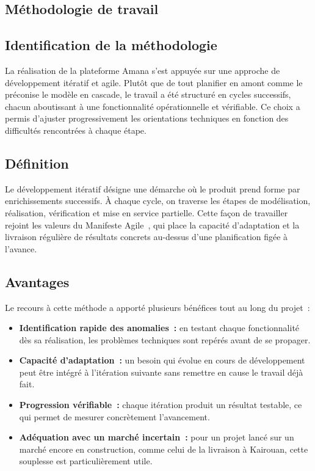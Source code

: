 \documentclass[12pt,fleqn,a4paper]{report}
\begin{document}
\begin{justify}
\section{Méthodologie de travail}

\subsection{Identification de la méthodologie}

La réalisation de la plateforme Amana s'est appuyée sur une approche de développement itératif et agile. Plutôt que de tout planifier en amont comme le préconise le modèle en cascade, le travail a été structuré en cycles successifs, chacun aboutissant à une fonctionnalité opérationnelle et vérifiable. Ce choix a permis d'ajuster progressivement les orientations techniques en fonction des difficultés rencontrées à chaque étape.

\subsection{Définition}

Le développement itératif désigne une démarche où le produit prend forme par enrichissements successifs. À chaque cycle, on traverse les étapes de modélisation, réalisation, vérification et mise en service partielle. Cette façon de travailler rejoint les valeurs du Manifeste Agile~\cite{agile_manifesto}, qui place la capacité d'adaptation et la livraison régulière de résultats concrets au-dessus d'une planification figée à l'avance.

\subsection{Avantages}

Le recours à cette méthode a apporté plusieurs bénéfices tout au long du projet~:

\begin{itemize}
    \item \textbf{Identification rapide des anomalies~:} en testant chaque fonctionnalité dès sa réalisation, les problèmes techniques sont repérés avant de se propager.
    \item \textbf{Capacité d'adaptation~:} un besoin qui évolue en cours de développement peut être intégré à l'itération suivante sans remettre en cause le travail déjà fait.
    \item \textbf{Progression vérifiable~:} chaque itération produit un résultat testable, ce qui permet de mesurer concrètement l'avancement.
    \item \textbf{Adéquation avec un marché incertain~:} pour un projet lancé sur un marché encore en construction, comme celui de la livraison à Kairouan, cette souplesse est particulièrement utile.
\end{itemize}


\end{justify}
\end{document}
